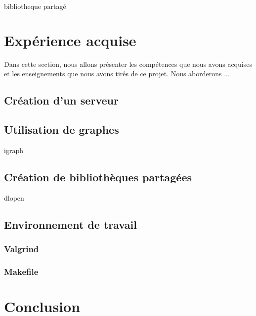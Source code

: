 \documentclass[dvipsnames]{rapportCS}
\begin{document}
bibliotheque partagé



\newpage

\section{Expérience acquise}

Dans cette section, nous allons présenter les compétences que nous avons acquises et les enseignements que nous avons tirés de ce projet. Nous aborderons ...

\subsection{Création d'un serveur}

\subsection{Utilisation de graphes}
igraph 

\subsection{Création de bibliothèques partagées}
dlopen

\subsection{Environnement de travail}

\subsubsection{Valgrind}

\subsubsection{Makefile}




\newpage

\section*{Conclusion}
\end{document}
